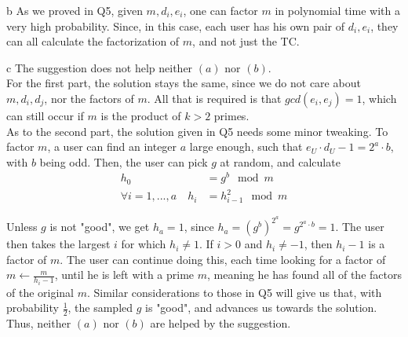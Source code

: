\documentclass{article}
\begin{document}
\begin{paragraph}
    b As we proved in Q5, given \(m, d_i, e_i\), one can factor \(m\) in polynomial time with a very high probability. Since, in this case, each user has his own pair of \(d_i, e_i\), they can all calculate the factorization of \(m\), and not just the TC.
\end{paragraph}

\begin{paragraph}
    c The suggestion does not help neither \((a)\) nor \((b)\).\\
    
    For the first part, the solution stays the same, since we do not care about \(m, d_i, d_j\), nor the factors of \(m\). All that is required is that \(gcd(e_i, e_j) = 1\), which can still occur if \(m\) is the product of \(k > 2\) primes.\\
    
    As to the second part, the solution given in Q5 needs some minor tweaking. To factor \(m\), a user can find an integer \(a\) large enough, such that \(e_U \cdot d_U - 1 = 2^a \cdot b\), with \(b\) being odd. Then, the user can pick \(g\) at random, and calculate
    \begin{align*}
        h_0 &= g^b \mod{m}\\
        \forall i = 1, ..., a \quad h_i &= h_{i - 1}^2 \mod{m}
    \end{align*}
    
    Unless \(g\) is not "good", we get \(h_a = 1\), since \(h_a = (g^b)^{2^a} = g^{2^a \cdot b} = 1\). The user then takes the largest \(i\) for which \(h_i \neq 1\). If \(i > 0\) and \(h_i \neq -1\), then \(h_i - 1\) is a factor of \(m\). The user can continue doing this, each time looking for a factor of \(m \gets \frac{m}{h_i - 1}\), until he is left with a prime \(m\), meaning he has found all of the factors of the original \(m\). Similar considerations to those in Q5 will give us that, with probability \(\frac{1}{2}\), the sampled \(g\) is "good", and advances us towards the solution.\\
    
    Thus, neither \((a)\) nor \((b)\) are helped by the suggestion.
\end{paragraph}
\end{document}
